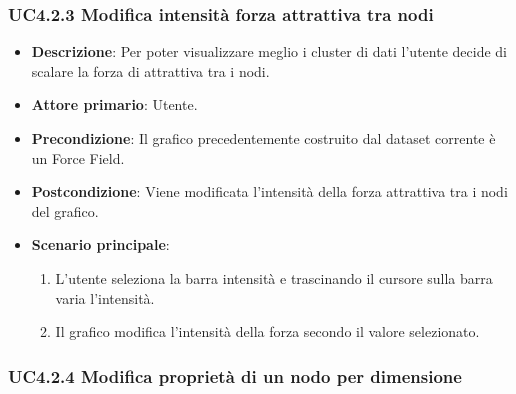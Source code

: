 \subsubsection{UC4.2.3 Modifica intensità forza attrattiva tra nodi}

\begin{itemize}
    \item \textbf{Descrizione}: Per poter visualizzare meglio i cluster di dati l’utente 
                                decide di scalare la forza di attrattiva tra i nodi.

	
    \item \textbf{Attore primario}: Utente.
    
    \item \textbf{Precondizione}:   Il grafico precedentemente costruito dal dataset corrente è un Force Field.
    \item \textbf{Postcondizione}:  Viene modificata l'intensità della forza attrattiva tra i nodi del grafico.

	\item \textbf{Scenario principale}:
        \begin{enumerate}
            \item L'utente seleziona la barra intensità e trascinando il cursore sulla barra varia l’intensità.
            \item Il grafico modifica l'intensità della forza secondo il valore selezionato.
        \end{enumerate}
\end{itemize}

\subsubsection{UC4.2.4 Modifica proprietà di un nodo per dimensione}


